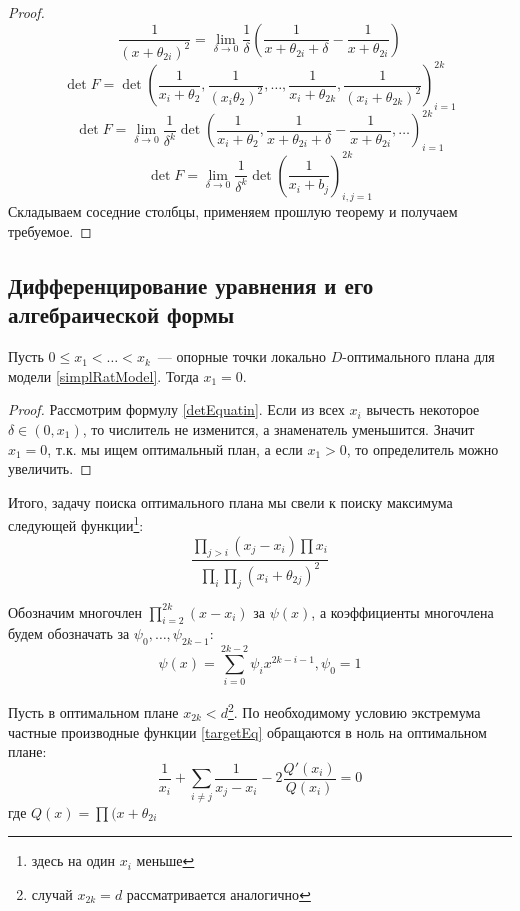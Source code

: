 \begin{proof}
$$ \frac{1}{(x + \theta_{2i})^2} = \lim\limits_{\delta \rightarrow 0} \frac{1}{\delta}\left(\frac{1}{x+\theta_{2i}+\delta} - \frac{1}{x+\theta_{2i}}\right)$$
$$\det F = \det \left(\frac{1}{x_i + \theta_2}, \frac{1}{(x_i \theta_2)^2}, …, \frac{1}{x_i+\theta_{2k}}, \frac{1}{(x_i + \theta_{2k})^2} \right)_{i=1}^{2k}$$
$$ \det F = \lim \limits_{\delta \rightarrow 0} \frac{1}{\delta^k} \det \left(\frac{1}{x_i + \theta_2}, \frac{1}{x+\theta_{2i}+\delta} - \frac{1}{x+\theta_{2i}}, … \right)_{i=1}^{2k}$$
$$\det F = \lim \limits_{\delta \rightarrow 0} \frac{1}{\delta^k}\det \left( \frac{1}{x_i + b_j} \right)_{i,j=1}^{2k}$$
Складываем соседние столбцы, применяем прошлую теорему и получаем требуемое.
\end{proof}

\subsection{Дифференцирование уравнения и его алгебраической формы}

\begin{thm}
Пусть $0 \leq x_1 < … < x_k$ — опорные точки локально $D$-оптимального плана для модели \eqref{simplRatModel}.  Тогда $x_1 = 0$.
\end{thm}
\begin{proof}
Рассмотрим формулу \eqref{detEquatin}. Если из всех $x_i$ вычесть некоторое $\delta \in (0, x_1)$, то числитель не изменится, а знаменатель уменьшится. Значит $x_1 = 0$, т.к. мы ищем оптимальный план, а если $x_1 >0$, то определитель можно увеличить.
\end{proof}

Итого, задачу поиска оптимального плана мы свели к поиску максимума следующей функции\footnote{здесь на один $x_i$ меньше}:
\begin{equation}
\label{targetEq}
\frac{\prod\limits_{j>i}(x_j - x_i) \prod x_i}{\prod\limits_i\prod\limits_j (x_i + \theta_{2j})^2}
\end{equation}

Обозначим многочлен $\prod\limits_{i=2}^{2k}(x-x_i)$ за $\psi(x)$, а коэффициенты многочлена будем обозначать за $\psi_0, …, \psi_{2k-1}$:
$$\psi(x) = \sum\limits_{i=0}^{2k-2}\psi_i x^{2k-i-1}, \psi_0 = 1$$

Пусть в оптимальном плане $x_{2k} < d$\footnote{случай $x_{2k}=d$ рассматривается аналогично}. По необходимому условию экстремума частные производные   функции \eqref{targetEq} обращаются в ноль на оптимальном плане:
$$ \frac{1}{x_i} + \sum\limits_{i\neq j} \frac{1}{x_j- x_i} - 2 \frac{Q'(x_i)}{Q(x_i)} = 0$$
где $Q(x)= \prod(x+\theta_{2i}$ 

